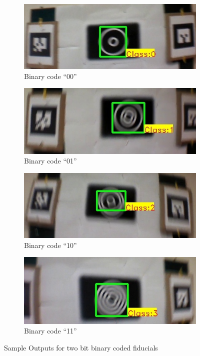 \documentclass[runningheads]{llncs}
\begin{document}
\begin{figure}
\begin{subfigure}{0.5\textwidth}
\centering
  \includegraphics[width=\linewidth]{output_00.jpg}
  \caption{Binary code ``00''}
  \label{fig:output0}
\end{subfigure}
\begin{subfigure}{0.5\textwidth}
\centering
  \includegraphics[width=\linewidth]{output_01.jpg}
  \caption{Binary code ``01''}
  \label{fig:output1}
\end{subfigure}
\begin{subfigure}{0.5\textwidth}
\centering
  \includegraphics[width=\linewidth]{output_10.jpg}
  \caption{Binary code ``10''}
  \label{fig:output2}
\end{subfigure}
\begin{subfigure}{0.5\textwidth}
\centering
  \includegraphics[width=\linewidth]{output_11.jpg}
  \caption{Binary code ``11''}
  \label{fig:output3}
  \end{subfigure}
  \caption{Sample Outputs for two bit binary coded fiducials}
\end{figure}
\end{document}
